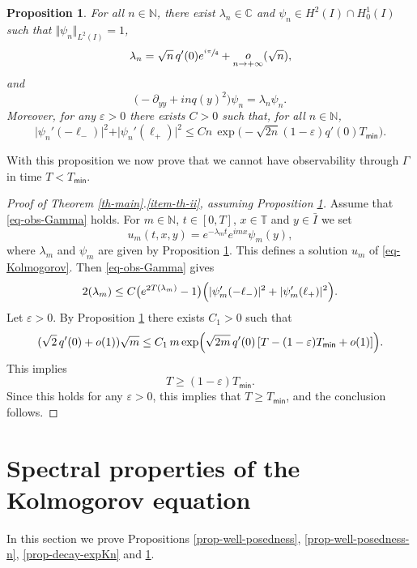 \documentclass[10pt]{amsart}
\theoremstyle{plain}
\newtheorem{proposition}[theorem]{Proposition}
\theoremstyle{definition}
\newcommand{\abs}[1]{\vert #1\vert}
\newcommand{\littleo}[2]{\mathop{o}\limits_{#1 \to #2}}
\newcommand{\1}{\mathds 1}
\let\Re\relax
\DeclareMathOperator{\Re}{\mathsf{Re}\mkern2mu}
\def\C{\mathbb{C}}
\newcommand{\N}{\mathbb{N}}
\newcommand{\T}{\mathbb{T}}
\let\G\Gamma
\let\e\varepsilon
\let\l\lambda
\newcommand{\Tmin}{T_{\mathsf{min}}}
\begin{document}
\begin {proposition}\label{prop-ln-psin}
For all $n \in \N$, there exist $\l_n \in \C$ and $\psi_n \in H^2(I) \cap H_0^1(I)$ such that $\Vert \psi_n \Vert_{L^2(I)} = 1$,
\begin{equation} \label{eq-lambda-n}
\l_n = \sqrt n\, q'(0) e^{\sfrac {i\pi}4} + \littleo{n}{+\infty}(\sqrt n),
\end{equation}
and
\[
\bigl(-\partial_{yy} + inq(y)^2 \bigr)\psi_n = \l_n \psi_n.
\]
Moreover, for any $\e > 0$ there exists $C > 0$ such that, for all $n \in \N$,
\begin{equation} \label{eq-Agmon-psi-n}
\vert \psi_n'(-\ell_-) \vert^2 + \vert \psi_n'(\ell_+) \vert^2 \leq
C n\, \exp\bigl(-\sqrt{2n}(1-\varepsilon) q'(0) \Tmin \bigr).
\end{equation}
\end{proposition}

With this proposition we now prove that we cannot have observability through $\G$ in time $T < \Tmin$.

\begin{proof}[Proof of Theorem \ref{th-main}.\eqref{item-th-ii}, assuming Proposition \ref{prop-ln-psin}]
Assume that \eqref{eq-obs-Gamma} holds. For $m \in \N$, $t \in [0,T]$, $x \in \T$ and $y \in \bar I$ we set
\[
u_m(t,x,y) = e^{-\lambda_m t} e^{i m x} \psi_m(y),
\]
where $\l_m$ and $\psi_m$ are given by Proposition \ref{prop-ln-psin}. This defines a solution $u_m$ of \eqref{eq-Kolmogorov}. Then \eqref{eq-obs-Gamma} gives
\[
2 \Re(\l_m) \leq C \bigl(e^{2T \Re(\l_m)}-1\bigr) \Bigl(\abs{\psi_m'(-\ell_-)}^2 + \abs{\psi_m'(\ell_+)}^2 \Bigr).
\]
Let $\varepsilon > 0$. By Proposition \ref{prop-ln-psin} there exists $C_1 > 0$ such that
\[
(\sqrt{2}\, q'(0) + o(1))\sqrt{m} \leq C_1 \, m \exp\Bigl(\sqrt{2m}\, q'(0) \left[ T - (1-\varepsilon) \Tmin + o(1) \right] \Bigr).
\]
This implies
\[
T \geq (1-\varepsilon) \Tmin.
\]
Since this holds for any $\e > 0$, this implies that $T \geq \Tmin$, and the conclusion follows.
\end{proof}

\section{Spectral properties of the Kolmogorov equation} \label{sec-spectral}

In this section we prove Propositions \ref{prop-well-posedness}, \ref{prop-well-posedness-n}, \ref{prop-decay-expKn} and \ref{prop-ln-psin}.

 \label{sec-wellposedness-proof}
\end{document}
